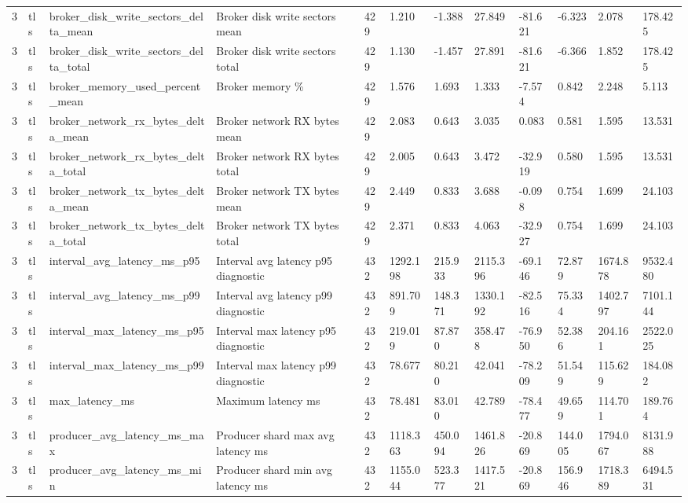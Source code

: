\begin{longtable}{llllllllllll}
3 & tls & broker\_disk\_write\_sectors\_delta\_mean & Broker disk write sectors mean & 429 & 1.210 & -1.388 & 27.849 & -81.621 & -6.323 & 2.078 & 178.425 \\
3 & tls & broker\_disk\_write\_sectors\_delta\_total & Broker disk write sectors total & 429 & 1.130 & -1.457 & 27.891 & -81.621 & -6.366 & 1.852 & 178.425 \\
3 & tls & broker\_memory\_used\_percent\_mean & Broker memory \% & 429 & 1.576 & 1.693 & 1.333 & -7.574 & 0.842 & 2.248 & 5.113 \\
3 & tls & broker\_network\_rx\_bytes\_delta\_mean & Broker network RX bytes mean & 429 & 2.083 & 0.643 & 3.035 & 0.083 & 0.581 & 1.595 & 13.531 \\
3 & tls & broker\_network\_rx\_bytes\_delta\_total & Broker network RX bytes total & 429 & 2.005 & 0.643 & 3.472 & -32.919 & 0.580 & 1.595 & 13.531 \\
3 & tls & broker\_network\_tx\_bytes\_delta\_mean & Broker network TX bytes mean & 429 & 2.449 & 0.833 & 3.688 & -0.098 & 0.754 & 1.699 & 24.103 \\
3 & tls & broker\_network\_tx\_bytes\_delta\_total & Broker network TX bytes total & 429 & 2.371 & 0.833 & 4.063 & -32.927 & 0.754 & 1.699 & 24.103 \\
3 & tls & interval\_avg\_latency\_ms\_p95 & Interval avg latency p95 diagnostic & 432 & 1292.198 & 215.933 & 2115.396 & -69.146 & 72.879 & 1674.878 & 9532.480 \\
3 & tls & interval\_avg\_latency\_ms\_p99 & Interval avg latency p99 diagnostic & 432 & 891.709 & 148.371 & 1330.192 & -82.516 & 75.334 & 1402.797 & 7101.144 \\
3 & tls & interval\_max\_latency\_ms\_p95 & Interval max latency p95 diagnostic & 432 & 219.019 & 87.870 & 358.478 & -76.950 & 52.386 & 204.161 & 2522.025 \\
3 & tls & interval\_max\_latency\_ms\_p99 & Interval max latency p99 diagnostic & 432 & 78.677 & 80.210 & 42.041 & -78.209 & 51.549 & 115.629 & 184.082 \\
3 & tls & max\_latency\_ms & Maximum latency ms & 432 & 78.481 & 83.010 & 42.789 & -78.477 & 49.659 & 114.701 & 189.764 \\
3 & tls & producer\_avg\_latency\_ms\_max & Producer shard max avg latency ms & 432 & 1118.363 & 450.094 & 1461.826 & -20.869 & 144.005 & 1794.067 & 8131.988 \\
3 & tls & producer\_avg\_latency\_ms\_min & Producer shard min avg latency ms & 432 & 1155.044 & 523.377 & 1417.521 & -20.869 & 156.946 & 1718.389 & 6494.531 \\

\end{longtable}
